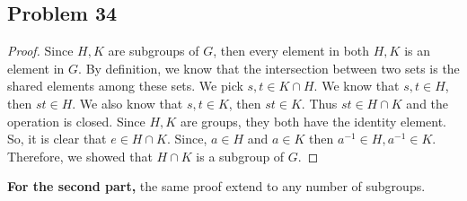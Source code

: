 \documentclass[a4paper,12pt]{article}
\begin{document}
\subsection*{Problem 34}
\begin{proof}
    Since $H,K$ are subgroups of $G$, then every element in both $H,K$ is an element in $G.$ By definition, we know that the intersection between two sets is the shared elements among these sets. We pick $s,t \in K \cap H.$ We know that $s,t \in H$, then $st \in H$. We also know that $s,t \in K$, then $st \in K$. Thus $st \in H \cap K$ and the operation is closed. Since $H,K$ are groups, they both have the identity element. So, it is clear that $e \in H \cap K.$ Since, $a \in H$ and $a \in K$ then $a^{-1}\in H, a^{-1}\in K.$ Therefore, we showed that $H \cap K$ is a subgroup of $G.$
\end{proof}
\textbf{For the second part,} the same proof extend to any number of subgroups.
\end{document}
